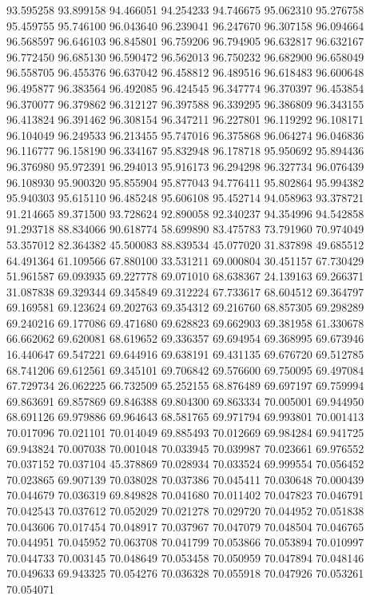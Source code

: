 93.595258
93.899158
94.466051
94.254233
94.746675
95.062310
95.276758
95.459755
95.746100
96.043640
96.239041
96.247670
96.307158
96.094664
96.568597
96.646103
96.845801
96.759206
96.794905
96.632817
96.632167
96.772450
96.685130
96.590472
96.562013
96.750232
96.682900
96.658049
96.558705
96.455376
96.637042
96.458812
96.489516
96.618483
96.600648
96.495877
96.383564
96.492085
96.424545
96.347774
96.370397
96.453854
96.370077
96.379862
96.312127
96.397588
96.339295
96.386809
96.343155
96.413824
96.391462
96.308154
96.347211
96.227801
96.119292
96.108171
96.104049
96.249533
96.213455
95.747016
96.375868
96.064274
96.046836
96.116777
96.158190
96.334167
95.832948
96.178718
95.950692
95.894436
96.376980
95.972391
96.294013
95.916173
96.294298
96.327734
96.076439
96.108930
95.900320
95.855904
95.877043
94.776411
95.802864
95.994382
95.940303
95.615110
96.485248
95.606108
95.452714
94.058963
93.378721
91.214665
89.371500
93.728624
92.890058
92.340237
94.354996
94.542858
91.293718
88.834066
90.618774
58.699890
83.475783
73.791960
70.974049
53.357012
82.364382
45.500083
88.839534
45.077020
31.837898
49.685512
64.491364
61.109566
67.880100
33.531211
69.000804
30.451157
67.730429
51.961587
69.093935
69.227778
69.071010
68.638367
24.139163
69.266371
31.087838
69.329344
69.345849
69.312224
67.733617
68.604512
69.364797
69.169581
69.123624
69.202763
69.354312
69.216760
68.857305
69.298289
69.240216
69.177086
69.471680
69.628823
69.662903
69.381958
61.330678
66.662062
69.620081
68.619652
69.336357
69.694954
69.368995
69.673946
16.440647
69.547221
69.644916
69.638191
69.431135
69.676720
69.512785
68.741206
69.612561
69.345101
69.706842
69.576600
69.750095
69.497084
67.729734
26.062225
66.732509
65.252155
68.876489
69.697197
69.759994
69.863691
69.857869
69.846388
69.804300
69.863334
70.005001
69.944950
68.691126
69.979886
69.964643
68.581765
69.971794
69.993801
70.001413
70.017096
70.021101
70.014049
69.885493
70.012669
69.984284
69.941725
69.943824
70.007038
70.001048
70.033945
70.039987
70.023661
69.976552
70.037152
70.037104
45.378869
70.028934
70.033524
69.999554
70.056452
70.023865
69.907139
70.038028
70.037386
70.045411
70.030648
70.000439
70.044679
70.036319
69.849828
70.041680
70.011402
70.047823
70.046791
70.042543
70.037612
70.052029
70.021278
70.029720
70.044952
70.051838
70.043606
70.017454
70.048917
70.037967
70.047079
70.048504
70.046765
70.044951
70.045952
70.063708
70.041799
70.053866
70.053894
70.010997
70.044733
70.003145
70.048649
70.053458
70.050959
70.047894
70.048146
70.049633
69.943325
70.054276
70.036328
70.055918
70.047926
70.053261
70.054071
